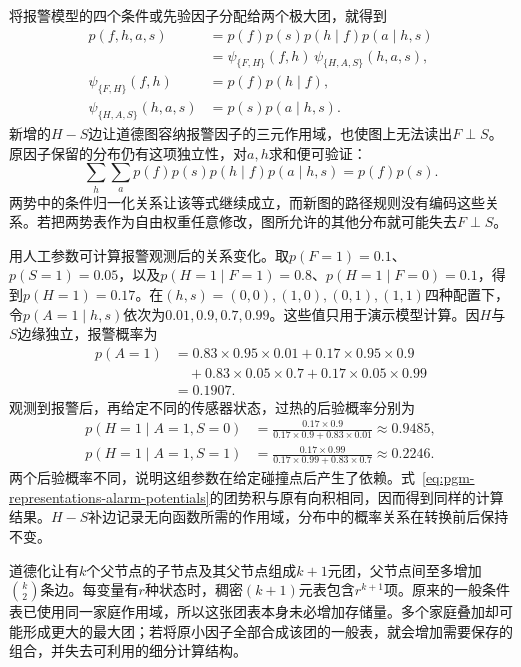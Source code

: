 将报警模型的四个条件或先验因子分配给两个极大团，就得到
\begin{equation}
  \begin{aligned}
    p(f,h,a,s)&=p(f)p(s)p(h\mid f)p(a\mid h,s)\\
    &=\psi_{\{F,H\}}(f,h)\,
      \psi_{\{H,A,S\}}(h,a,s),\\
    \psi_{\{F,H\}}(f,h)&=p(f)p(h\mid f),\\
    \psi_{\{H,A,S\}}(h,a,s)&=p(s)p(a\mid h,s).
  \end{aligned}
  \label{eq:pgm-representations-alarm-potentials}
\end{equation}
新增的$H-S$边让道德图容纳报警因子的三元作用域，也使图上无法读出$F\perp S$。原因子保留的分布仍有这项独立性，对$a,h$求和便可验证：
\[
  \sum_h\sum_a p(f)p(s)p(h\mid f)p(a\mid h,s)
  =p(f)p(s).
\]
两势中的条件归一化关系让该等式继续成立，而新图的路径规则没有编码这些关系。若把两势表作为自由权重任意修改，图所允许的其他分布就可能失去$F\perp S$。

用人工参数可计算报警观测后的关系变化。取$p(F=1)=0.1$、$p(S=1)=0.05$，以及$p(H=1\mid F=1)=0.8$、$p(H=1\mid F=0)=0.1$，得到$p(H=1)=0.17$。在$(h,s)=(0,0),(1,0),(0,1),(1,1)$四种配置下，令$p(A=1\mid h,s)$依次为$0.01,0.9,0.7,0.99$。这些值只用于演示模型计算。因$H$与$S$边缘独立，报警概率为
\[
  \begin{aligned}
    p(A=1)
    &=0.83\times0.95\times0.01
      +0.17\times0.95\times0.9\\
    &\quad+0.83\times0.05\times0.7
      +0.17\times0.05\times0.99\\
    &=0.1907.
  \end{aligned}
\]
观测到报警后，再给定不同的传感器状态，过热的后验概率分别为
\begin{equation}
  \begin{aligned}
    p(H=1\mid A=1,S=0)
    &=\frac{0.17\times0.9}
    {0.17\times0.9+0.83\times0.01}
    \approx0.9485,\\
    p(H=1\mid A=1,S=1)
    &=\frac{0.17\times0.99}
    {0.17\times0.99+0.83\times0.7}
    \approx0.2246.
  \end{aligned}
  \label{eq:pgm-representations-alarm-posteriors}
\end{equation}
两个后验概率不同，说明这组参数在给定碰撞点后产生了依赖。式~\eqref{eq:pgm-representations-alarm-potentials}的团势积与原有向积相同，因而得到同样的计算结果。$H-S$补边记录无向函数所需的作用域，分布中的概率关系在转换前后保持不变。

道德化让有$k$个父节点的子节点及其父节点组成$k+1$元团，父节点间至多增加$\binom{k}{2}$条边。每变量有$r$种状态时，稠密$(k+1)$元表包含$r^{k+1}$项。原来的一般条件表已使用同一家庭作用域，所以这张团表本身未必增加存储量。多个家庭叠加却可能形成更大的最大团；若将原小因子全部合成该团的一般表，就会增加需要保存的组合，并失去可利用的细分计算结构。

